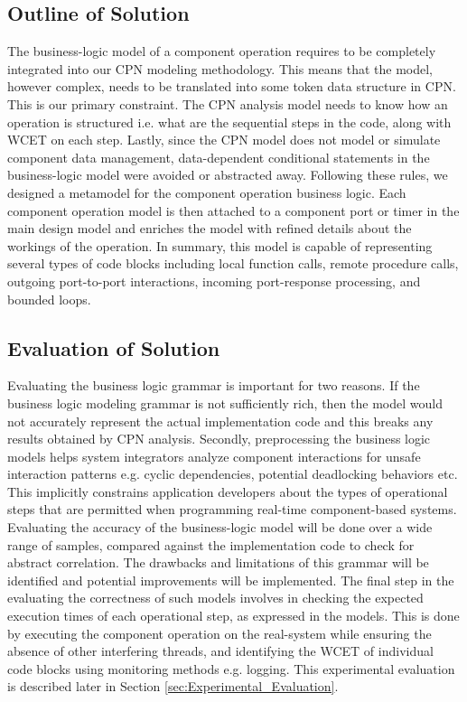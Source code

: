 \subsection{Outline of Solution}
The business-logic model of a component operation requires to be completely integrated into our CPN modeling methodology. This means that the model, however complex, needs to be translated into some token data structure in CPN. This is our primary constraint. The CPN analysis model needs to know how an operation is structured i.e. what are the sequential steps in the code, along with WCET on each step. Lastly, since the CPN model does not model or simulate component data management, data-dependent conditional statements in the business-logic model were avoided or abstracted away. Following these rules, we designed a metamodel for the component operation business logic. Each component operation model is then attached to a component port or timer in the main design model and enriches the model with refined details about the workings of the operation. In summary, this model is capable of representing several types of code blocks including local function calls, remote procedure calls, outgoing port-to-port interactions, incoming port-response processing, and bounded loops.

\subsection{Evaluation of Solution}
Evaluating the business logic grammar is important for two reasons. If the business logic modeling grammar is not sufficiently rich, then the model would not accurately represent the actual implementation code and this breaks any results obtained by CPN analysis. Secondly, preprocessing the business logic models helps system integrators analyze component interactions for unsafe interaction patterns e.g. cyclic dependencies, potential deadlocking behaviors etc. This implicitly constrains application developers about the types of operational steps that are permitted when programming real-time component-based systems. Evaluating the accuracy of the business-logic model will be done over a wide range of samples, compared against the implementation code to check for abstract correlation. The drawbacks and limitations of this grammar will be identified and potential improvements will be implemented. The final step in the evaluating the correctness of such models involves in checking the expected execution times of each operational step, as expressed in the models. This is done by executing the component operation on the real-system while ensuring the absence of other interfering threads, and identifying the WCET of individual code blocks using monitoring methods e.g. logging. This experimental evaluation is described later in Section \ref{sec:Experimental_Evaluation}.

